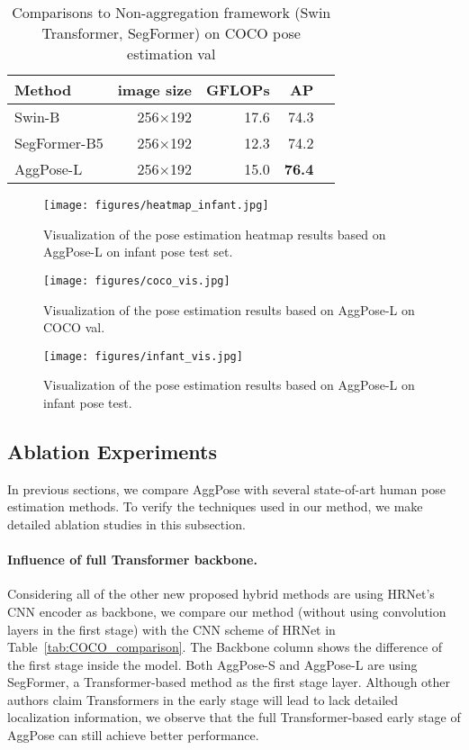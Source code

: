 \documentclass{article}
\begin{document}
\begin{table}
\centering
\begin{tabular}{lrrrr}
\toprule
Method  & image size & GFLOPs & AP \\
\midrule
Swin-B       & 256$\times$192  & 17.6  & 74.3      \\
SegFormer-B5 & 256$\times$192  & 12.3     & 74.2       \\
AggPose-L    & 256$\times$192  & 15.0     & \textbf{76.4}    \\
\bottomrule
\end{tabular}
\caption{Comparisons to Non-aggregation framework (Swin Transformer, SegFormer) on COCO pose estimation val}
\label{tab:abulation_comparison}
\end{table}

\begin{figure*}[h]
  \centering
  \texttt{[image: figures/heatmap\_infant.jpg]} 
  \caption{Visualization of the pose estimation heatmap results based on AggPose-L on infant pose test set.}
  \label{fig:heatmap_infant}
\end{figure*}


\begin{figure}[h]
  \centering
  \texttt{[image: figures/coco\_vis.jpg]} 
  \caption{Visualization of the pose estimation results based on AggPose-L on COCO val.}
  \label{fig:coco_vis}
\end{figure}


\begin{figure}[h]
  \centering
  \texttt{[image: figures/infant\_vis.jpg]} 
  \caption{Visualization of the pose estimation results based on AggPose-L on infant pose test.}
  \label{fig:infant_vis}
\end{figure}


\subsection{Ablation Experiments}

In previous sections, we compare AggPose with several state-of-art human pose estimation methods. To verify the techniques used in our method, we make detailed ablation studies in this subsection.

\paragraph{Influence of full Transformer backbone.} Considering all of the other new proposed hybrid methods are using HRNet's CNN encoder as backbone, we compare our method (without using convolution layers in the first stage) with the CNN scheme of HRNet in Table~\ref{tab:COCO_comparison}. The Backbone column shows the difference of the first stage inside the model. Both AggPose-S and AggPose-L are using SegFormer, a Transformer-based method as the first stage layer. Although other authors claim Transformers in the early stage will lead to lack detailed localization information, we observe that the full Transformer-based early stage of AggPose can still achieve better performance.
\end{document}
